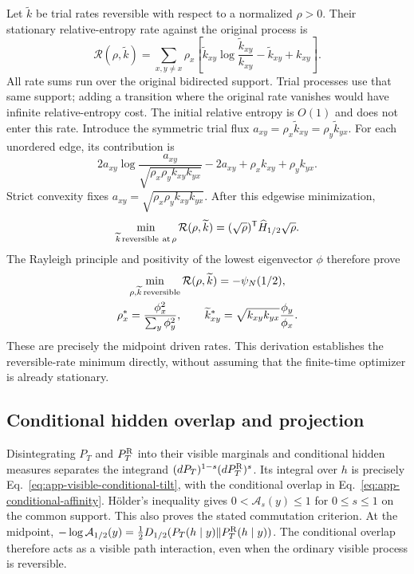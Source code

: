 \documentclass[aps,pre,reprint,amsmath,amssymb,longbibliography,floatfix]{revtex4-2}
\begin{document}
Let $\widetilde k$ be trial rates reversible with respect to a
normalized $\rho>0$. Their stationary relative-entropy rate against
the original process is
\begin{equation}
 \mathcal R(\rho,\widetilde k)
 =\sum_{x,y\ne x}\rho_x
 \left[
 \widetilde k_{xy}\log\frac{\widetilde k_{xy}}{k_{xy}}
 -\widetilde k_{xy}+k_{xy}
 \right].
 \label{eq:app-relative-entropy-rate}
\end{equation}
All rate sums run over the original bidirected support. Trial processes
use that same support; adding a transition where the original rate vanishes
would have infinite relative-entropy cost. The initial relative entropy is
$O(1)$ and does not enter this rate.
Introduce the symmetric trial flux
$a_{xy}=\rho_x\widetilde k_{xy}
       =\rho_y\widetilde k_{yx}$.
For each unordered edge, its contribution is
\begin{equation}
 2a_{xy}\log\frac{a_{xy}}
 {\sqrt{\rho_x\rho_y k_{xy}k_{yx}}}
 -2a_{xy}+\rho_xk_{xy}+\rho_yk_{yx}.
 \label{eq:app-flux-cost}
\end{equation}
Strict convexity fixes
$a_{xy}=\sqrt{\rho_x\rho_y k_{xy}k_{yx}}$.
After this edgewise minimization,
\begin{equation}
 \min_{\widetilde k\,{\rm reversible\ at}\,\rho}
       \mathcal R(\rho,\widetilde k)
 =(\sqrt\rho)^{\mathsf T}\widehat H_{1/2}\sqrt\rho.
 \label{eq:app-flux-rayleigh}
\end{equation}
The Rayleigh principle and positivity of the lowest eigenvector
$\phi$ therefore prove
\begin{equation}
 \begin{gathered}
 \min_{\rho,\widetilde k\,{\rm reversible}}\mathcal R(\rho,\widetilde k)
 =-\psi_N(1/2),\\
 \rho_x^*=\frac{\phi_x^2}{\sum_y\phi_y^2},\qquad
 \widetilde k_{xy}^*=\sqrt{k_{xy}k_{yx}}\frac{\phi_y}{\phi_x}.
 \end{gathered}
 \label{eq:app-optimal-reversible-rates}
\end{equation}
These are precisely the midpoint driven rates. This derivation
establishes the reversible-rate minimum directly, without assuming
that the finite-time optimizer is already stationary.

\subsection{Conditional hidden overlap and projection}
\label{app:conditional-overlap}

Disintegrating $P_T$ and $P_T^{\rm R}$ into their visible marginals
and conditional hidden measures separates the integrand
$(dP_T)^{1-s}(dP_T^{\rm R})^s$. Its integral over $h$ is precisely
Eq.~\eqref{eq:app-visible-conditional-tilt}, with the conditional overlap
in Eq.~\eqref{eq:app-conditional-affinity}. H\"older's inequality gives
$0<\mathcal A_s(y)\leq1$ for $0\leq s\leq1$ on the common support.
This also proves the stated commutation criterion.
At the midpoint,
$-\log \mathcal A_{1/2}(y)=\tfrac12
D_{1/2}(P_T(h\mid y)\Vert
        P_T^{\rm R}(h\mid y))$.
The conditional overlap therefore acts as a visible path interaction,
even when the ordinary visible process is reversible.
\end{document}
